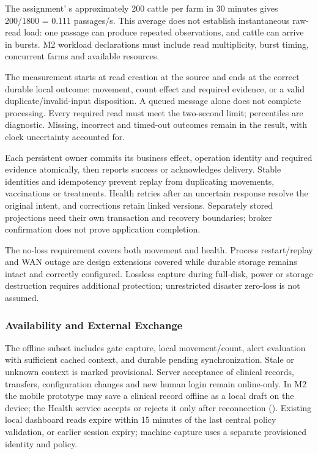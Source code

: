 The assignment' s approximately 200 cattle per farm in 30
minutes gives 200/1800 = 0.111 passages/s. This average does not
establish instantaneous raw-read load: one passage can produce repeated
observations, and cattle can arrive in bursts. M2 workload declarations
must include read multiplicity, burst timing, concurrent farms and
available resources.

The measurement starts at read creation at the source and ends
at the correct durable local outcome: movement, count effect and
required evidence, or a valid duplicate/invalid-input disposition. A
queued message alone does not complete processing. Every required read
must meet the two-second limit; percentiles are diagnostic. Missing,
incorrect and timed-out outcomes remain in the result, with clock
uncertainty accounted for.

Each persistent owner commits its business effect, operation identity
and required evidence atomically, then reports success or acknowledges
delivery. Stable identities and idempotency prevent replay from
duplicating movements, vaccinations or treatments. Health retries after
an uncertain response resolve the original intent, and corrections
retain linked versions. Separately stored projections need their own
transaction and recovery boundaries; broker confirmation does not prove
application completion.

The no-loss requirement covers both movement and health. Process
restart/replay and WAN outage are design extensions covered while durable
storage remains intact and correctly configured. Lossless capture during
full-disk, power or storage destruction requires additional protection;
unrestricted disaster zero-loss is not assumed.

\subsubsection{Availability and External Exchange}\label{sec:2.2.2}

The offline subset includes gate capture, local movement/count,
alert evaluation with sufficient cached context, and durable pending
synchronization. Stale or unknown context is marked provisional.
Server acceptance of clinical records, transfers, configuration changes
and new human login remain online-only. In M2 the mobile prototype may
save a clinical record offline as a local draft on the device; the
Health service accepts or rejects it only after reconnection
(). Existing local dashboard reads expire within 15 minutes of the last central policy validation, or earlier
session expiry; machine capture uses a separate provisioned identity and
policy.

